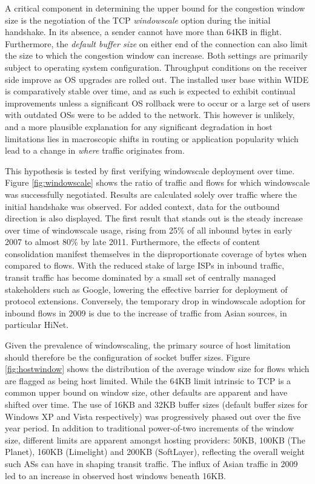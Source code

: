 A critical component in determining the upper bound for the congestion window size is the negotiation of the \ac{TCP} \emph{windowscale} option during the initial handshake. 
In its absence, a sender cannot have more than 64KB in flight.
Furthermore, the \emph{default buffer size} on either end of the connection can also limit the size to which the congestion window can increase.
Both settings are primarily subject to operating system configuration.
Throughput conditions on the receiver side improve as \acs{OS} upgrades are rolled out.
The installed user base within \acs{WIDE} is comparatively stable over time, and as such is expected to exhibit continual improvements unless a significant \acs{OS} rollback were to occur or a large set of users with outdated \acp{OS} were to be added to the network.
This however is unlikely, and a more plausible explanation for any significant degradation in host limitations lies in macroscopic shifts in routing or application popularity which lead to a change in \emph{where} traffic originates from.

This hypothesis is tested by first verifying windowscale deployment over time.
Figure \ref{fig:windowscale} shows the ratio of traffic and flows for which windowscale was successfully negotiated.
Results are calculated solely over traffic where the initial handshake was observed.
For added context, data for the outbound direction is also displayed.
The first result that stands out is the steady increase over time of windowscale usage, rising from 25\% of all inbound bytes in early 2007 to almost 80\% by late 2011.
Furthermore, the effects of content consolidation manifest themselves in the disproportionate coverage of bytes when compared to flows.
With the reduced stake of large \acp{ISP} in inbound traffic, transit traffic has become dominated by a small set of centrally managed stakeholders such as Google, lowering the effective barrier for deployment of protocol extensions.
Conversely, the temporary drop in windowscale adoption for inbound flows in 2009 is due to the increase of traffic from Asian sources, in particular HiNet.

Given the prevalence of windowscaling, the primary source of host limitation should therefore be the configuration of socket buffer sizes.
Figure \ref{fig:hostwindow} shows the distribution of the average window size for flows which are flagged as being host limited.
While the 64KB limit intrinsic to \ac{TCP} is a common upper bound on window size, other defaults are apparent and have shifted over time.
The use of 16KB and 32KB buffer sizes (default buffer sizes for Windows XP and Vista respectively) was progressively phased out over the five year period.
In addition to traditional power-of-two increments of the window size, different limits are apparent amongst hosting providers: 50KB, 100KB (The Planet), 160KB (Limelight) and 200KB (SoftLayer), reflecting the overall weight such \acp{AS} can have in shaping transit traffic.
The influx of Asian traffic in 2009 led to an increase in observed host windows beneath 16KB.

